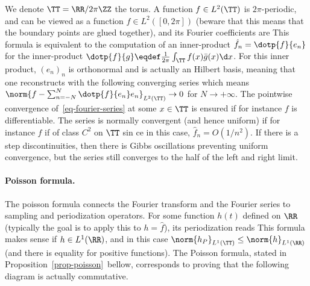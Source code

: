 We denote $\TT=\RR/2\pi\ZZ$ the torus.
%
A function $f \in L^2(\TT)$ is $2\pi$-periodic, and can be viewed as a function $f \in L^2([0,2\pi])$ (beware that this means that the boundary points are glued together), and its Fourier coefficients are
This formula is equivalent to the computation of an inner-product $\hat f_n = \dotp{f}{e_n}$ for the inner-product $\dotp{f}{g} \eqdef \frac{1}{2\pi} \int_\TT f(x) \bar g(x) \d x$. 
%
For this inner product, $(e_n)_n$ is orthonormal and is actually an Hilbert basis, meaning that one reconstructs with the following converging series 
which means $\norm{f-\sum_{n=-N}^N \dotp{f}{e_n} e_n}_{L^2(\TT)} \rightarrow 0$ for $N \rightarrow +\infty$.
%
The pointwise convergence of~\eqref{eq-fourier-series} at some $x \in \TT$ is ensured if for instance $f$ is differentiable. The series is normally convergent (and hence uniform) if for instance $f$ if of class $C^2$ on $\TT$ sin ce in this case, $\hat f_n = O(1/n^2)$. 
%
If there is a step discontinuities, then there is Gibbs oscillations preventing uniform convergence, but the series still converges to the half of the left and right limit.


\paragraph{Poisson formula.}

The poisson formula connects the Fourier transform and the Fourier series to sampling and periodization operators.
%
For some function $h(t)$ defined on $\RR$ (typically the goal is to apply this to $h=\hat f$), its periodization reads
This formula makes sense if $h \in L^1(\RR)$, and in this case $\norm{h_P}_{L^1(\TT)} \leq \norm{h}_{L^1(\RR)}$ (and there is equality for positive functions). 
%
The Poisson formula, stated in Proposition~\ref{prop-poisson} bellow, corresponds to proving that the following diagram
is actually commutative.

